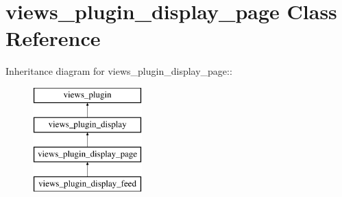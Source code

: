 \hypertarget{classviews__plugin__display__page}{
\section{views\_\-plugin\_\-display\_\-page Class Reference}
\label{classviews__plugin__display__page}
}
Inheritance diagram for views\_\-plugin\_\-display\_\-page::\begin{figure}[H]
\begin{center}
\leavevmode
\includegraphics[height=4cm]{classviews__plugin__display__page}
\end{center}
\end{figure}
